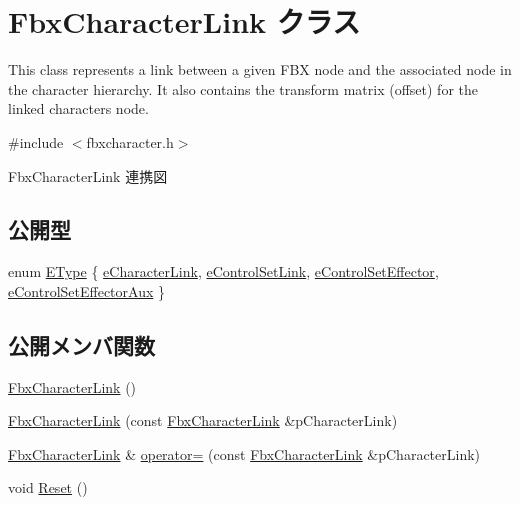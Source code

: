 \hypertarget{class_fbx_character_link}{}\section{Fbx\+Character\+Link クラス}
\label{class_fbx_character_link}


This class represents a link between a given F\+BX node and the associated node in the character hierarchy. It also contains the transform matrix (offset) for the linked character\textquotesingle{}s node.  




{\ttfamily \#include $<$fbxcharacter.\+h$>$}



Fbx\+Character\+Link 連携図
\subsection*{公開型}
\begin{DoxyCompactItemize}
\item 
enum \hyperlink{class_fbx_character_link_ae90994844e941f231b6be3d59e21cdce}{E\+Type} \{ \hyperlink{class_fbx_character_link_ae90994844e941f231b6be3d59e21cdcea3c6edcc191bd2ae7b38dd3dae622664e}{e\+Character\+Link}, 
\hyperlink{class_fbx_character_link_ae90994844e941f231b6be3d59e21cdcea7be82df8ca326a6f5c9b0ab941eac56a}{e\+Control\+Set\+Link}, 
\hyperlink{class_fbx_character_link_ae90994844e941f231b6be3d59e21cdceab6d996b0d5953868166ee20d85efd04e}{e\+Control\+Set\+Effector}, 
\hyperlink{class_fbx_character_link_ae90994844e941f231b6be3d59e21cdcea6c5f01876533ecb6dfd92b2bd6969666}{e\+Control\+Set\+Effector\+Aux}
 \}
\end{DoxyCompactItemize}
\subsection*{公開メンバ関数}
\begin{DoxyCompactItemize}
\item 
\hyperlink{class_fbx_character_link_ab2f755a75b24f1e1ffbe21f61b4f718f}{Fbx\+Character\+Link} ()
\item 
\hyperlink{class_fbx_character_link_a8f9d5ca289fe6fc60e6d3648112f8dcc}{Fbx\+Character\+Link} (const \hyperlink{class_fbx_character_link}{Fbx\+Character\+Link} \&p\+Character\+Link)
\item 
\hyperlink{class_fbx_character_link}{Fbx\+Character\+Link} \& \hyperlink{class_fbx_character_link_ace29a4d8c4a64bd6325513e6348c2504}{operator=} (const \hyperlink{class_fbx_character_link}{Fbx\+Character\+Link} \&p\+Character\+Link)
\item 
void \hyperlink{class_fbx_character_link_a9d0e6c6b7fc03ccb93283d79f763403f}{Reset} ()
\end{DoxyCompactItemize}
